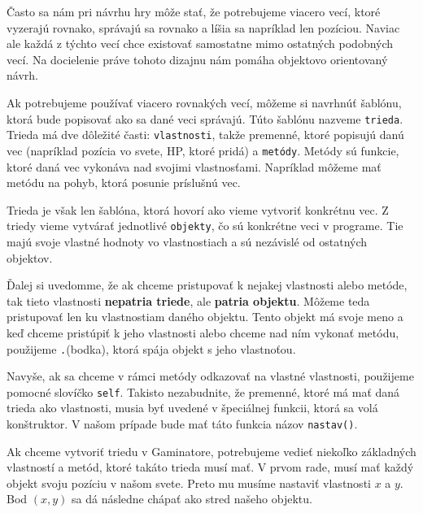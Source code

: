 





Často sa nám pri návrhu hry môže stať, že potrebujeme viacero vecí, ktoré vyzerajú rovnako, správajú
sa rovnako a líšia sa napríklad len pozíciou. Naviac ale každá z týchto vecí chce existovať
samostatne mimo ostatných podobných vecí. Na docielenie práve tohoto dizajnu nám pomáha objektovo
orientovaný návrh.

Ak potrebujeme používať viacero rovnakých vecí, môžeme si navrhnúť šablónu, ktorá bude popisovať ako
sa dané veci správajú. Túto šablónu nazveme \texttt{trieda}. Trieda má dve dôležité časti:
\texttt{vlastnosti}, takže premenné, ktoré popisujú danú vec (napríklad pozícia vo svete, HP, ktoré
pridá) a \texttt{metódy}. Metódy sú funkcie, ktoré daná vec vykonáva nad svojimi vlastnosťami.
Napríklad môžeme mať metódu na pohyb, ktorá posunie príslušnú vec.

Trieda je však len šablóna, ktorá hovorí ako vieme vytvoriť konkrétnu vec. Z triedy vieme vytvárať
jednotlivé \texttt{objekty}, čo sú konkrétne veci v programe. Tie majú svoje vlastné hodnoty vo
vlastnostiach a sú nezávislé od ostatných objektov.

Ďalej si uvedomme, že ak chceme pristupovať k nejakej vlastnosti alebo metóde, tak tieto vlastnosti
\textbf{nepatria triede}, ale \textbf{patria objektu}. Môžeme teda pristupovať len ku vlastnostiam
daného objektu. Tento objekt má svoje meno a keď chceme pristúpiť k jeho vlastnosti alebo chceme nad
ním vykonať metódu, použijeme \texttt{.}(bodka), ktorá spája objekt s jeho vlastnoťou.

Navyše, ak sa chceme v rámci metódy odkazovať na vlastné vlastnosti, použijeme pomocné slovíčko
\texttt{self}. Takisto nezabudnite, že premenné, ktoré má mať daná trieda ako vlastnosti, musia byť
uvedené v špeciálnej funkcii, ktorá sa volá konštruktor. V našom prípade bude mať táto funkcia názov
\texttt{nastav()}.


Ak chceme vytvoriť triedu v Gaminatore, potrebujeme vedieť niekoľko základných vlastností a metód,
ktoré takáto trieda musí mať. V prvom rade, musí mať každý objekt svoju pozíciu v našom svete. Preto
mu musíme nastaviť vlastnosti $x$ a $y$. Bod $(x,y)$ sa dá následne chápať ako stred našeho objektu.

